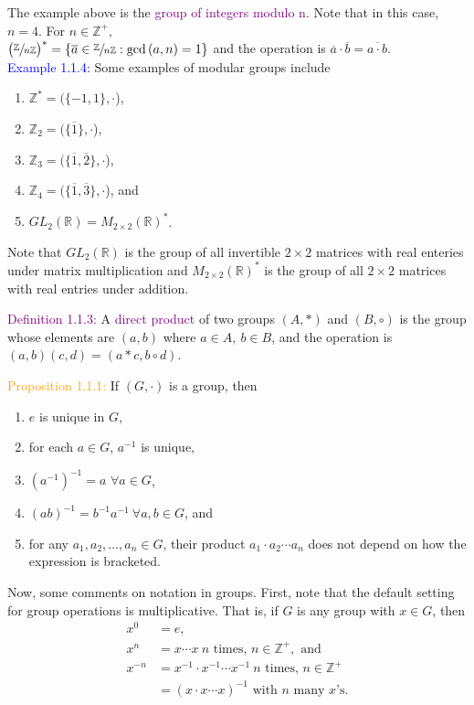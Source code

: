 \documentclass{article}
\begin{document}
The example above is the \textcolor{purple}{group of integers modulo n}. Note that in this case, $n=4$. For 
$n \in \mathbb{Z}^+,$ \\ $ \bigl( \sfrac{\mathbb{Z}}{n\mathbb{Z}} \bigr)^* = \{ \overline{a} \in \sfrac{\mathbb{Z}}{n\mathbb{Z}}: \gcd{(a,n)} = 1 \}$ 
and the operation is $\overline{a} \cdot \overline{b} = \overline{a \cdot b}$.\\

\textcolor{blue}{Example 1.1.4:} Some examples of modular groups include
\begin{enumerate}
    \item $\mathbb{Z}^*= (\{-1,1\}, \cdot$),
    \item $\mathbb{Z}_2 = (\{\overline{1}\}, \cdot$),
    \item $\mathbb{Z}_3 = (\{\overline{1}, \overline{2}\}, \cdot$),
    \item $\mathbb{Z}_4 = (\{\overline{1}, \overline{3}\}, \cdot$), and
    \item $GL_2(\mathbb{R}) = M_{2 \times 2}(\mathbb{R})^*$.
\end{enumerate}
Note that $GL_2(\mathbb{R})$ is the group of all invertible $2 \times 2$ matrices with real enteries under matrix multiplication and 
$M_{2 \times 2}(\mathbb{R})^*$ is the group of all $2 \times 2$ matrices with real entries under addition.

\textcolor{purple}{Definition 1.1.3:} A \textcolor{purple}{direct product} of two groups $(A,*)$ and $(B, \circ)$ is the group whose 
elements are $(a,b)$ where $a \in A, \ b \in B$, and the operation is $(a,b)(c,d) = (a * c, b \circ d)$.

\textcolor{orange}{Proposition 1.1.1:} If $(G, \cdot)$ is a group, then
\begin{enumerate}
    \item $e$ is unique in $G$,
    \item for each $a \in G$, $a^{-1}$ is unique,
    \item $(a^{-1})^{-1}=a$ $\forall a \in G$,
    \item $(ab)^{-1} = b^{-1}a^{-1} \ \forall a,b \in G$, and 
    \item for any $a_1, a_2, \dots, a_n \in G$, their product $a_1 \cdot a_2 \cdots a_n$ does not depend on how the expression is 
    bracketed.
\end{enumerate}

Now, some comments on notation in groups. First, note that the default setting for group operations is multiplicative. That is, if $G$ 
is any group with $x \in G$, then
\begin{align*}
    x^0 &= e, \\
    x^n &= x \cdots x \ n \text{ times, } n \in \mathbb{Z}^+, \text{ and }\\
    x^{-n} &= x^{-1} \cdot x^{-1} \cdots x^{-1} \ n \text{ times, } n \in \mathbb{Z}^+ \\
    &= (x \cdot x \cdots x)^{-1} \text{ with } n \text{ many } x \text{'s}. 
\end{align*}
\end{document}
